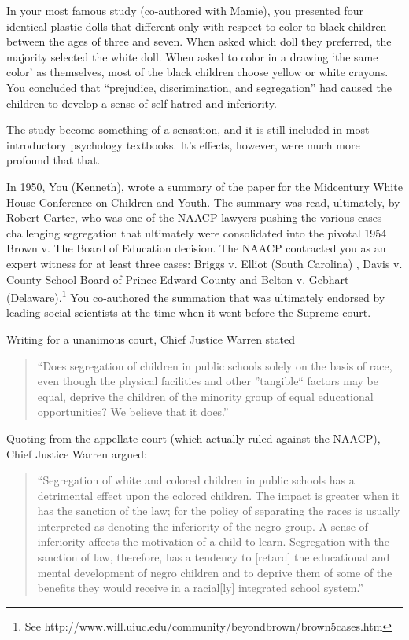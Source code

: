 \begin{refsection}
In your most famous study (co-authored with Mamie), you presented four identical plastic dolls that different only with respect to color to black children between the ages of three and seven. When asked which doll they preferred, the majority selected the white doll. When asked to color in a drawing `the same color' as themselves, most of the black children choose yellow or white crayons. You concluded that ``prejudice, discrimination, and segregation'' had caused the children to develop a sense of self-hatred and inferiority.

The study become something of a sensation, and it is still included in most introductory psychology textbooks. It's effects, however, were much more profound that that.

In 1950, You (Kenneth), wrote a summary of the paper for the Midcentury White House Conference on Children and Youth. The summary was read, ultimately, by Robert Carter, who was one of the NAACP lawyers pushing the various cases challenging segregation that ultimately were consolidated into the pivotal 1954 Brown v. The Board of Education decision. The NAACP contracted you as an expert witness for at least three cases: Briggs v. Elliot (South Carolina) , Davis v. County School Board of Prince Edward County and Belton v. Gebhart (Delaware).\footnote{See http:\slash \slash www.will.uiuc.edu\slash community\slash beyondbrown\slash brown5cases.htm} You co-authored the summation that was ultimately endorsed by leading social scientists at the time when it went before the Supreme court.

Writing for a unanimous court, Chief Justice Warren stated

\begin{quote}

``Does segregation of children in public schools solely on the basis of race, even though the physical facilities and other ''tangible`` factors may be equal, deprive the children of the minority group of equal educational opportunities? We believe that it does.''
\end{quote}

Quoting from the appellate court (which actually ruled against the NAACP), Chief Justice Warren argued:

\begin{quote}

``Segregation of white and colored children in public schools has a detrimental effect upon the colored children. The impact is greater when it has the sanction of the law; for the policy of separating the races is usually interpreted as denoting the inferiority of the negro group. A sense of inferiority affects the motivation of a child to learn. Segregation with the sanction of law, therefore, has a tendency to [retard] the educational and mental development of negro children and to deprive them of some of the benefits they would receive in a racial[ly] integrated school system.'' 
\end{quote}


\end{refsection}
